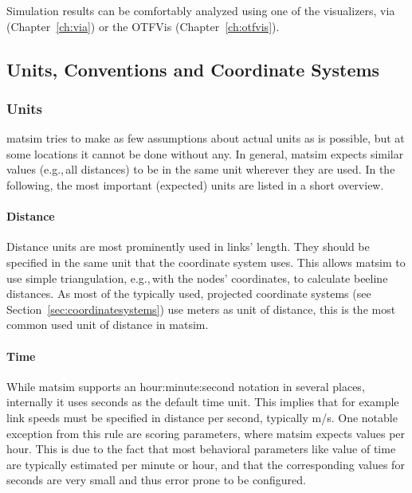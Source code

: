 Simulation results can be comfortably analyzed using one of the visualizers, via (Chapter~\ref{ch:via}) or the OTFVis (Chapter~\ref{ch:otfvis}).

\subsection{Units, Conventions and Coordinate Systems}
\label{sec:unitsconventions}
\subsubsection{Units}
\gls{matsim} tries to make as few assumptions about actual units as is possible, but at some locations it cannot be done without any. In general, \gls{matsim} expects similar values (e.g.,\,all distances) to be in the same unit wherever they are used. In the following, the most important (expected) units are listed in a short overview. 

\paragraph{Distance}

Distance units are most prominently used in links' length. They should be specified in the same unit that the coordinate system uses. This allows \gls{matsim} to use simple triangulation, e.g.,\,with the nodes' coordinates, to calculate beeline distances. As most of the typically used, projected coordinate systems (see Section~\ref{sec:coordinatesystems}) use meters as unit of distance, this is the most common used unit of distance in \gls{matsim}. 

\paragraph{Time}

While \gls{matsim} supports an hour:minute:second notation in several places, internally it uses seconds as the default time unit. This implies that for example link speeds must be specified in distance per second, typically m/s. One notable exception from this rule are scoring parameters, where \gls{matsim} expects values per hour. This is due to the fact that most behavioral parameters like value of time are typically estimated per minute or hour, and that the corresponding values for seconds are very small and thus error prone to be configured. 

